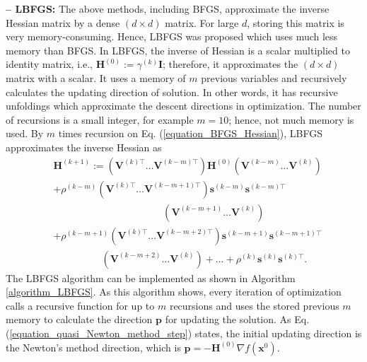 \documentclass[lang=cn,10pt]{gorgeousnbook}
\numberwithin{equation}{section}%
\numberwithin{figure}{section}%
\begin{document}
\hfill\break
\textbf{-- LBFGS: }
The above methods, including BFGS, approximate the inverse Hessian matrix by a dense $(d \times d)$ matrix. For large $d$, storing this matrix is very memory-consuming. Hence, LBFGS \cite{nocedal1980updating,liu1989limited} was proposed which uses much less memory than BFGS. 
In LBFGS, the inverse of Hessian is a scalar multiplied to identity matrix, i.e., $\boldsymbol{H}^{(0)} := \gamma^{(k)} \boldsymbol{I}$; therefore, it approximates the $(d \times d)$ matrix with a scalar. It uses a memory of $m$ previous variables and recursively calculates the updating direction of solution. 
In other words, it has recursive unfoldings which approximate the descent directions in optimization. 
The number of recursions is a small integer, for example $m = 10$; hence, not much memory is used. By $m$ times recursion on Eq. (\ref{equation_BFGS_Hessian}), LBFGS approximates the inverse Hessian as
\begin{align*}
& \boldsymbol{H}^{(k+1)} := (\boldsymbol{V}^{(k)\top} \dots \boldsymbol{V}^{(k-m)\top}) \boldsymbol{H}^{(0)} (\boldsymbol{V}^{(k-m)} \dots \boldsymbol{V}^{(k)}) \\
& + \rho^{(k-m)} (\boldsymbol{V}^{(k)\top} \dots \boldsymbol{V}^{(k-m+1)\top}) \boldsymbol{s}^{(k-m)} \boldsymbol{s}^{(k-m)\top} \\ 
&~~~~~~~~~~~~~~~~~~~~~~~~~~~~~~~~~~~~~~~~~~~~~~~~~~ (\boldsymbol{V}^{(k-m+1)} \dots \boldsymbol{V}^{(k)}) \\
& + \rho^{(k-m+1)} (\boldsymbol{V}^{(k)\top} \dots \boldsymbol{V}^{(k-m+2)\top}) \boldsymbol{s}^{(k-m+1)} \boldsymbol{s}^{(k-m+1)\top} \\ 
&~~~~~~~~~~~~~~~~~~~~~~ (\boldsymbol{V}^{(k-m+2)} \dots \boldsymbol{V}^{(k)}) + \dots + \rho^{(k)} \boldsymbol{s}^{(k)} \boldsymbol{s}^{(k)\top}. 
\end{align*}
The LBFGS algorithm can be implemented as shown in Algorithm \ref{algorithm_LBFGS}. As this algorithm shows, every iteration of optimization calls a recursive function for up to $m$ recursions and uses the stored previous $m$ memory to calculate the direction $\boldsymbol{p}$ for updating the solution. As Eq. (\ref{equation_quasi_Newton_method_step}) states, the initial updating direction is the Newton's method direction, which is $\boldsymbol{p} = - \boldsymbol{H}^{(0)} \nabla f(\boldsymbol{x}^{0})$.


\end{document}
